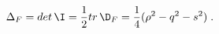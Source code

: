 \begin{equation}
\label{e4:17}
\Delta_F=det\,\I=\frac{1}{2} tr\, \D_F=\frac{1}{4}(\rho^2-q^2-s^2) \; .
\end{equation}

